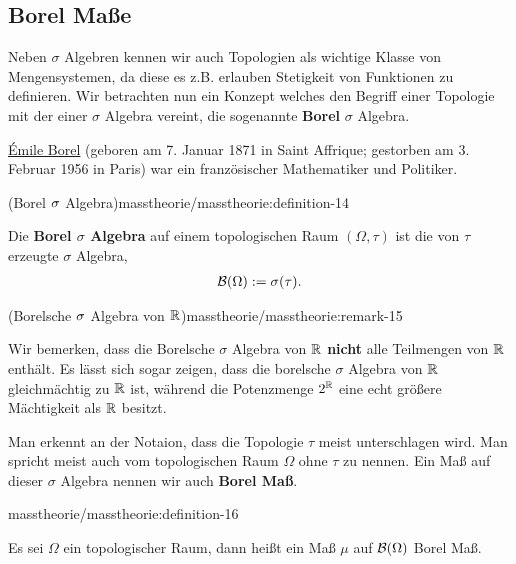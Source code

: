 \subsection{Borel Maße}
\label{\detokenize{masstheorie/masstheorie:borel-masze}}
\par
Neben \(\sigma\) Algebren kennen wir auch Topologien als wichtige Klasse von Mengensystemen, da diese es z.B. erlauben Stetigkeit von Funktionen zu definieren. Wir betrachten nun ein Konzept welches den Begriff einer Topologie mit der einer \(\sigma\) Algebra vereint, die sogenannte \textbf{Borel} \(\sigma\) Algebra.

\begin{emphBox}{}{}

\par
\href{https://de.wikipedia.org/wiki/\%C3\%89mile\_Borel}{Émile Borel} (geboren am 7. Januar 1871 in Saint Affrique; gestorben am 3. Februar 1956 in Paris) war ein französischer Mathematiker und Politiker.
\end{emphBox}
\begin{definition}{(Borel \protect\(\sigma\protect\) Algebra)}{masstheorie/masstheorie:definition-14}



\par
Die \textbf{Borel \(\sigma\) Algebra} auf einem topologischen Raum \((\Omega, \tau)\) ist die von \(\tau\) erzeugte \(\sigma\) Algebra,
\begin{align*}
\mathcal{B}(\Omega) := \sigma(\tau).
\end{align*}\end{definition}
\begin{remark}{(Borelsche \protect\(\sigma\protect\) Algebra von \protect\(\mathbb{R}\protect\))}{masstheorie/masstheorie:remark-15}



\par
Wir bemerken, dass die Borelsche \(\sigma\) Algebra von \(\mathbb{R}\) \textbf{nicht} alle Teilmengen von \(\mathbb{R}\) enthält.
Es lässt sich sogar zeigen, dass die borelsche \(\sigma\) Algebra von \(\mathbb{R}\) gleichmächtig zu \(\mathbb{R}\) ist, während die Potenzmenge \(2^{\mathbb{R}}\) eine echt größere Mächtigkeit als \(\mathbb{R}\) besitzt.
\end{remark}

\par
Man erkennt an der Notaion, dass die Topologie \(\tau\) meist unterschlagen wird. Man spricht meist auch vom topologischen Raum \(\Omega\) ohne \(\tau\) zu nennen.
Ein Maß auf dieser \(\sigma\) Algebra nennen wir auch \textbf{Borel Maß}.
\begin{definition}{}{masstheorie/masstheorie:definition-16}



\par
Es sei \(\Omega\) ein topologischer Raum, dann heißt ein Maß \(\mu\) auf \(\mathcal{B}(\Omega)\) Borel Maß.
\end{definition}


